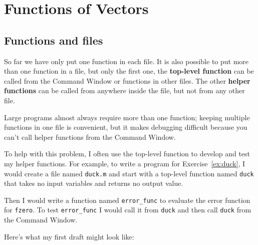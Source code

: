 \documentclass[
]{book}
\numberwithin{Answer}{chapter}
\numberwithin{Exercise}{chapter}
\begin{document}









\chapter{Functions of Vectors}


\section{Functions and files}
\label{sect:funfiles}

So far we have only put one function in each file.  It is also possible
to put more than one function in a file, but only the first one, the
{\bf top-level function} can be called from the {\sf Command
Window} or functions in other files. 
The other {\bf helper functions} can be called from anywhere inside the file, but not from any other file.


Large programs almost always require more than one function; keeping
multiple functions in one file is convenient, but it makes debugging
difficult because you can't call helper functions from the {\sf Command
Window}.

To help with this problem, I often use the top-level function
to develop and test my helper functions.  For example, to write
a program for Exercise~\ref{ex:duck}, I would create a file named
{\tt duck.m} and start with a top-level function named {\tt duck}
that takes no input variables and returns no output value.

Then I would write a function named {\tt error\_func} to
evaluate the error function for {\tt fzero}.  To test
{\tt error\_func} I would call it from {\tt duck} and then
call {\tt duck} from the {\sf Command Window}.

Here's what my first draft might look like:
\end{document}
